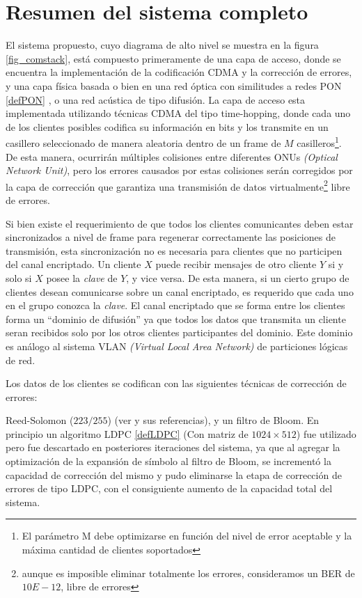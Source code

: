 \section{Resumen del sistema completo}
El sistema propuesto, cuyo diagrama de alto nivel se muestra en la figura \ref{fig_comstack}, está compuesto primeramente de una capa de acceso, donde se encuentra la implementación de la codificación CDMA y la corrección de errores, y una capa física basada o bien en una red óptica con similitudes a redes PON \ref{defPON} , o una red acústica de tipo difusión.
La capa de acceso esta implementada utilizando técnicas CDMA del tipo time-hopping, donde cada uno de los clientes posibles codifica su información en bits y los transmite en un casillero seleccionado de manera aleatoria dentro de un frame de $M$ casilleros\footnote{ El parámetro M debe optimizarse en función del nivel de error aceptable y la máxima cantidad de clientes soportados}. De esta manera, ocurrirán múltiples colisiones entre diferentes ONUs \textit{(Optical Network Unit)}, pero los errores causados por estas colisiones serán corregidos por la capa de corrección que garantiza una transmisión de datos virtualmente\footnote{aunque es imposible eliminar totalmente los errores, consideramos un BER de $10E-12$, libre de errores} libre de errores. 

Si bien existe el requerimiento de que todos los clientes comunicantes deben estar sincronizados a nivel de frame para regenerar correctamente las posiciones de transmisión, esta sincronización no es necesaria para clientes que no participen del canal encriptado.
Un cliente $X$ puede recibir mensajes de otro cliente $Y$ si y solo si $X$ posee la {\em clave} de $Y$, y vice versa. De esta manera, si un cierto grupo de clientes desean comunicarse sobre un canal encriptado, es requerido que cada uno en el grupo conozca la {\em clave}. El canal encriptado que se forma entre los clientes forma un ``dominio de difusión'' ya que todos los datos que transmita un cliente seran recibidos solo por los otros clientes participantes del dominio. Este dominio es análogo al sistema VLAN \textit{(Virtual Local Area Network)} de particiones lógicas de red.

Los datos de los clientes se codifican con las siguientes técnicas de corrección de errores:

Reed-Solomon ($223/255$) (ver \cite{Moon:05} y sus referencias), y un filtro de Bloom\cite{Bloom70space/timetrade-offs}. En principio un algoritmo LDPC \ref{defLDPC} (Con matriz de $1024\times512$) fue utilizado pero fue descartado en posteriores iteraciones del sistema, ya que al agregar la optimización de la expansión de símbolo al filtro de Bloom, se incrementó la capacidad de corrección del mismo y pudo eliminarse la etapa de corrección de errores de tipo LDPC, con el consiguiente aumento de la capacidad total del sistema.

